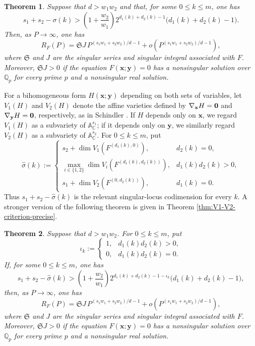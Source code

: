 \documentclass[12pt,reqno]{amsart}
\newtheorem{theorem}{Theorem}[section]
\theoremstyle{definition}
\theoremstyle{remark}
\numberwithin{equation}{section}
\def\bfx{{\mathbf x}}
\def\bfy{{\mathbf y}}
\def\C{{\mathbb C}}\def\D{{\mathbb D}}
\def\A{{\mathbb A}}
\begin{document}
\begin{theorem}\label{thm:component-singular-locus}
Suppose that $d>w_1w_2$ and that, for some $0\leq k\leq m$, one has
\[
    s_1+s_2-\sigma(k)
    >
    \left(1+\frac{w_2}{w_1}\right)
    2^{d_1(k)+d_2(k)-1}
    \bigl(d_1(k)+d_2(k)-1\bigr).
\]
Then, as $P\to\infty$, one has
\[
    R_F(P)
    =\mathfrak S J\,
    P^{(s_1w_1+s_2w_2)/d-1}
    +o\left(P^{(s_1w_1+s_2w_2)/d-1}\right),
\]
where $\mathfrak S$ and $J$ are the singular series and singular integral
associated with $F$. Moreover, $\mathfrak S J>0$ if the equation
$F(\bfx;\bfy)=0$ has a nonsingular solution over $\mathbb Q_p$ for every
prime $p$ and a nonsingular real solution.
\end{theorem}

For a bihomogeneous form $H(\bfx;\bfy)$ depending on both sets of
variables, let $V_1(H)$ and $V_2(H)$ denote the affine varieties defined
by $\nabla_{\bfx}H=\bf0$ and $\nabla_{\bfy}H=\bf0$, respectively, as in
Schindler \cite{Schindler2014,Schindler2016}. If $H$ depends only on
$\bfx$, we regard $V_1(H)$ as a subvariety of $\A_{\C}^{s_1}$; if it
depends only on $\bfy$, we similarly regard $V_2(H)$ as a subvariety of
$\A_{\C}^{s_2}$. For $0\leq k\leq m$, put
\begin{equation}\label{def:hat sigma}
\widehat{\sigma}(k):=
\begin{cases}
s_2+\dim V_1(F^{(d_1(k),0)}),&d_2(k)=0,\\[2mm]
\displaystyle\max_{i\in\{1,2\}}
\dim V_i(F^{(d_1(k),d_2(k))}),&d_1(k)d_2(k)>0,\\[2mm]
s_1+\dim V_2(F^{(0,d_2(k))}),&d_1(k)=0.
\end{cases}
\end{equation}
Thus $s_1+s_2-\widehat{\sigma}(k)$ is the relevant singular-locus
codimension for every $k$. A stronger version of the following theorem is
given in Theorem \ref{thm:V1-V2-criterion-precise}.

\begin{theorem}\label{thm:V1-V2-criterion}
Suppose that $d>w_1w_2$. For $0\leq k\leq m$, put
\[
    \iota_k:=
    \begin{cases}
        1,&d_1(k)d_2(k)>0,\\
        0,&d_1(k)d_2(k)=0.
    \end{cases}
\]
If, for some $0\leq k\leq m$, one has
\[
    s_1+s_2-\widehat{\sigma}(k)
    >
    \left(1+\frac{w_2}{w_1}\right)
    2^{d_1(k)+d_2(k)-1-\iota_k}
    \bigl(d_1(k)+d_2(k)-1\bigr),
\]
then, as $P\to\infty$, one has
\[
    R_F(P)
    =\mathfrak S J\,
    P^{(s_1w_1+s_2w_2)/d-1}
    +o\left(P^{(s_1w_1+s_2w_2)/d-1}\right),
\]
where $\mathfrak S$ and $J$ are the singular series and singular integral
associated with $F$. Moreover, $\mathfrak S J>0$ if the equation
$F(\bfx;\bfy)=0$ has a nonsingular solution over $\mathbb Q_p$ for every
prime $p$ and a nonsingular real solution.
\end{theorem}
\end{document}
